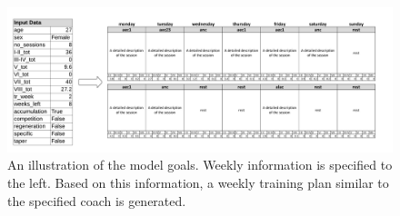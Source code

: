 \begin{figure}
    \centering
    \includegraphics[width=0.9\textheight,angle=90]{chapters/figures/model_goal.pdf}
    \caption{An illustration of the model goals. Weekly information is specified to the left. Based on this information, a weekly training plan similar to the specified coach is generated.}
    \label{fig:model_goal}
\end{figure}






